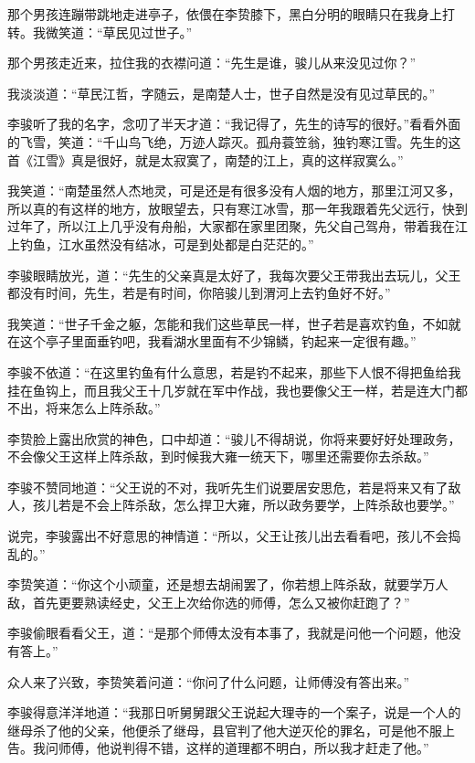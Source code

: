 那个男孩连蹦带跳地走进亭子，依偎在李贽膝下，黑白分明的眼睛只在我身上打转。我微笑道：“草民见过世子。”

那个男孩走近来，拉住我的衣襟问道：“先生是谁，骏儿从来没见过你？”

我淡淡道：“草民江哲，字随云，是南楚人士，世子自然是没有见过草民的。”

李骏听了我的名字，念叨了半天才道：“我记得了，先生的诗写的很好。”看看外面的飞雪，笑道：“千山鸟飞绝，万迹人踪灭。孤舟蓑笠翁，独钓寒江雪。先生的这首《江雪》真是很好，就是太寂寞了，南楚的江上，真的这样寂寞么。”

我笑道：“南楚虽然人杰地灵，可是还是有很多没有人烟的地方，那里江河又多，所以真的有这样的地方，放眼望去，只有寒江冰雪，那一年我跟着先父远行，快到过年了，所以江上几乎没有舟船，大家都在家里团聚，先父自己驾舟，带着我在江上钓鱼，江水虽然没有结冰，可是到处都是白茫茫的。”

李骏眼睛放光，道：“先生的父亲真是太好了，我每次要父王带我出去玩儿，父王都没有时间，先生，若是有时间，你陪骏儿到渭河上去钓鱼好不好。”

我笑道：“世子千金之躯，怎能和我们这些草民一样，世子若是喜欢钓鱼，不如就在这个亭子里面垂钓吧，我看湖水里面有不少锦鳞，钓起来一定很有趣。”

李骏不依道：“在这里钓鱼有什么意思，若是钓不起来，那些下人恨不得把鱼给我挂在鱼钩上，而且我父王十几岁就在军中作战，我也要像父王一样，若是连大门都不出，将来怎么上阵杀敌。”

李贽脸上露出欣赏的神色，口中却道：“骏儿不得胡说，你将来要好好处理政务，不会像父王这样上阵杀敌，到时候我大雍一统天下，哪里还需要你去杀敌。”

李骏不赞同地道：“父王说的不对，我听先生们说要居安思危，若是将来又有了敌人，孩儿若是不会上阵杀敌，怎么捍卫大雍，所以政务要学，上阵杀敌也要学。”

说完，李骏露出不好意思的神情道：“所以，父王让孩儿出去看看吧，孩儿不会捣乱的。”

李贽笑道：“你这个小顽童，还是想去胡闹罢了，你若想上阵杀敌，就要学万人敌，首先更要熟读经史，父王上次给你选的师傅，怎么又被你赶跑了？”

李骏偷眼看看父王，道：“是那个师傅太没有本事了，我就是问他一个问题，他没有答上。”

众人来了兴致，李贽笑着问道：“你问了什么问题，让师傅没有答出来。”

李骏得意洋洋地道：“我那日听舅舅跟父王说起大理寺的一个案子，说是一个人的继母杀了他的父亲，他便杀了继母，县官判了他大逆灭伦的罪名，可是他不服上告。我问师傅，他说判得不错，这样的道理都不明白，所以我才赶走了他。”

